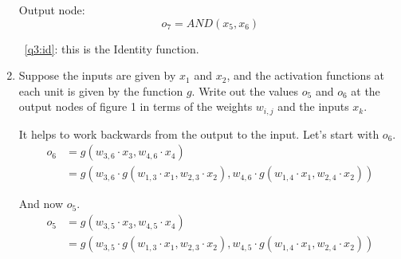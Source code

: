 \documentclass[12pt,letterpaper]{article}
\begin{document}
\begin{enumerate}
      Output node:
        \[o_7 = AND(x_5, x_6)\]

      ~\ref{q3:id}: this is the Identity function.
    \item
      Suppose the inputs are given by $x_1$ and $x_2$,
      and the activation functions at each unit is given by the function $g$.
      Write out the values $o_5$ and $o_6$ at the output nodes of figure 1
      in terms of the weights $w_{i,j}$ and the inputs $x_k$.

      It helps to work backwards from the output to the input.
      Let's start with $o_6$.
      \begin{align*}
        o_6 &= g(w_{3,6} \cdot x_3, w_{4,6} \cdot x_4) \\
        &= g(w_{3,6} \cdot g(w_{1,3} \cdot x_1, w_{2,3} \cdot x_2), w_{4,6} \cdot g(w_{1,4} \cdot x_1, w_{2,4} \cdot x_2))
      \end{align*}

      And now $o_5$.
      \begin{align*}
        o_5 &= g(w_{3,5} \cdot x_3, w_{4,5} \cdot x_4) \\
        &= g(w_{3,5} \cdot g(w_{1,3} \cdot x_1, w_{2,3} \cdot x_2), w_{4,5} \cdot g(w_{1,4} \cdot x_1, w_{2,4} \cdot x_2))
      \end{align*}
  \end{enumerate}
\end{document}
